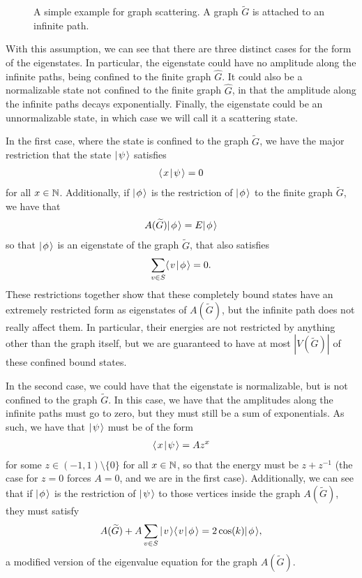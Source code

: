 \documentclass[../thesis-main/thesis-main]{subfiles}
\begin{document}
\begin{figure}
  \centering
  
  \caption{A simple example for graph scattering.  A graph $\widetilde{G}$ is attached to an infinite path.}
  \label{fig:path_and_graph}
\end{figure}

With this assumption, we can see that there are three distinct cases for the form of the eigenstates.  In particular, the eigenstate could have no amplitude along the infinite paths, being confined to the finite graph $\widehat{G}$.  It could also be a normalizable state not confined to the finite graph $\widehat{G}$, in that the amplitude along the infinite paths decays exponentially.  Finally, the eigenstate could be an unnormalizable state, in which case we will call it a scattering state.

In the first case, where the state is confined to the graph $\widetilde{G}$, we have the major restriction that the state $|\mspace{2mu} \psi \mspace{2mu} \rangle$ satisfies 
\begin{align}
  \langle\mspace{2mu} x \mspace{2mu} | \mspace{2mu} \psi\mspace{2mu} \rangle = 0
\end{align}
for all $x\in \mathbb{N}$.  Additionally, if $|\mspace{2mu} \phi \mspace{2mu} \rangle$ is the restriction of $|\mspace{2mu} \phi \mspace{2mu} \rangle$ to the finite graph $\widetilde{G}$, we have that 
\begin{align}
  A(\widetilde{G}) |\mspace{2mu} \phi \mspace{2mu} \rangle = E |\mspace{2mu} \phi \mspace{2mu} \rangle
\end{align}
so that $|\mspace{2mu} \phi \mspace{2mu} \rangle$ is an eigenstate of the graph $\widetilde{G}$, that also satisfies
\begin{align}
  \sum_{v\in S} \langle\mspace{2mu} v \mspace{2mu} | \mspace{2mu} \phi\mspace{2mu} \rangle = 0.
\end{align}
These restrictions together show that these completely bound states have an extremely restricted form as eigenstates of $A(\widetilde{G})$, but the infinite path does not really affect them.  In particular, their energies are not restricted by anything other than the graph itself, but we are guaranteed to have at most $|V(\widetilde{G})|$ of these confined bound states.

In the second case, we could have that the eigenstate is normalizable, but is not confined to the graph $\widetilde{G}$.  In this case, we have that the amplitudes along the infinite paths must go to zero, but they must still be a sum of exponentials.  As such, we have that $|\mspace{2mu} \psi \mspace{2mu} \rangle$ must be of the form
\begin{align}
  \langle\mspace{2mu} x \mspace{2mu} | \mspace{2mu} \psi\mspace{2mu} \rangle = A z^x
\end{align} 
for some $z\in (-1,1)\setminus \{0\}$ for all $x\in \mathbb{N}$, so that the energy must be $z+ z^{-1}$ (the case for $z= 0$ forces $A = 0$, and we are in the first case).  Additionally, we can see that if $|\mspace{2mu} \phi \mspace{2mu} \rangle$ is the restriction of $|\mspace{2mu} \psi \mspace{2mu} \rangle$ to those vertices inside the graph $A(\widetilde{G})$, they must satisfy
\begin{align}
  A(\widetilde{G}) + A \sum_{v\in S} |\mspace{2mu} v \mspace{2mu} \rangle\langle\mspace{2mu} v \mspace{2mu} | \mspace{2mu} \phi\mspace{2mu} \rangle = 2 \cos (k) |\mspace{2mu} \phi \mspace{2mu} \rangle,
\end{align}
a modified version of the eigenvalue equation for the graph $A(\widetilde{G})$.
\end{document}
